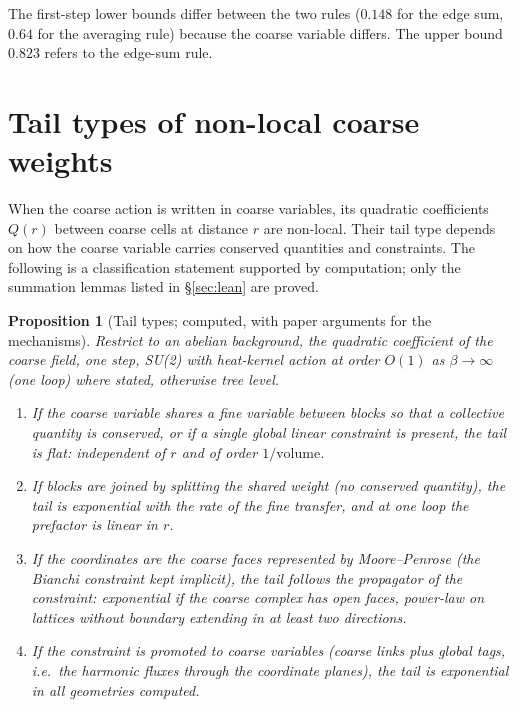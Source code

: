 \documentclass[11pt,a4paper]{article}
\newtheorem{proposition}[theorem]{Proposition}
\theoremstyle{definition}
\theoremstyle{remark}
\begin{document}
The first-step lower bounds differ between the two rules ($0.148$ for the edge sum, $0.64$ for the averaging rule) because the coarse variable differs.
The upper bound $0.823$ refers to the edge-sum rule.

\section{Tail types of non-local coarse weights}\label{sec:tails}

When the coarse action is written in coarse variables, its quadratic coefficients $Q(r)$ between coarse cells at distance $r$ are non-local. Their tail type depends on how the coarse variable carries conserved quantities and constraints. The following is a classification statement supported by computation; only the summation lemmas listed in \S\ref{sec:lean} are proved.

\begin{proposition}[Tail types; computed, with paper arguments for the mechanisms]\label{prop:tails}
Restrict to an abelian background, the quadratic coefficient of the coarse field, one step, SU(2) with heat-kernel action at order $O(1)$ as $\beta\to\infty$ (one loop) where stated, otherwise tree level.
\begin{enumerate}[label=(\arabic*)]
\item If the coarse variable shares a fine variable between blocks so that a collective quantity is conserved, or if a single global linear constraint is present, the tail is \emph{flat}: independent of $r$ and of order $1/\text{volume}$.
\item If blocks are joined by splitting the shared weight (no conserved quantity), the tail is \emph{exponential} with the rate of the fine transfer, and at one loop the prefactor is linear in $r$.
\item If the coordinates are the coarse faces represented by Moore--Penrose (the Bianchi constraint kept implicit), the tail follows the propagator of the constraint: exponential if the coarse complex has open faces, \emph{power-law} on lattices without boundary extending in at least two directions.
\item If the constraint is promoted to coarse variables (coarse links plus global tags, i.e.\ the harmonic fluxes through the coordinate planes), the tail is exponential in all geometries computed.
\end{enumerate}
\end{proposition}
\end{document}
